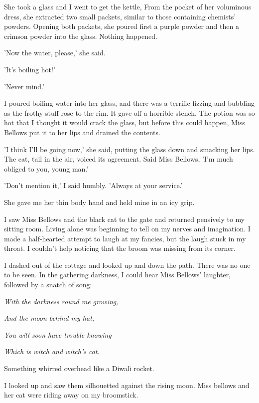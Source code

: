 \par
She took a glass and I went to get the kettle, From the pocket of her voluminous dress, she extracted two small packets, similar to those containing chemists' powders. Opening both packets, she poured first a purple powder and then a crimson powder into the glass. Nothing happened.
\par
'Now the water, please,' she said.
\par
'It's boiling hot!'
\par
'Never mind.'
\par
I poured boiling water into her glass, and there was a terrific fizzing and bubbling as the frothy stuff rose to the rim. It gave off a horrible stench. The potion was so hot that I thought it would crack the glass, but before this could happen, Miss Bellows put it to her lips and drained the contents.
\par
'I think I'll be going now,' she said, putting the glass down and smacking her lips. The cat, tail in the air, voiced its agreement. Said Miss Bellows, 'I'm much obliged to you, young man.'
\par
'Don't mention it,' I said humbly. 'Always at your service.'
\par
She gave me her thin body hand and held mine in an icy grip.
\par
I saw Miss Bellows and the black cat to the gate and returned pensively to my sitting room. Living alone was beginning to tell on my nerves and imagination. I made a half-hearted attempt to laugh at my fancies, but the laugh stuck in my throat. I couldn't help noticing that the broom was missing from its corner.
\par
I dashed out of the cottage and looked up and down the path. There was no one to be seen. In the gathering darkness, I could hear Miss Bellows' laughter, followed by a snatch of song:
\vspace{0.4in}
\par
\textit{With the darkness round me growing,}
\par
\textit{And the moon behind my hat,}
\par
\textit{You will soon have trouble knowing}
\par
\textit{Which is witch and witch's cat.}
\vspace{0.4in}
\par
Something whirred overhead like a Diwali rocket.
\par
I looked up and saw them silhouetted against the rising moon. Miss bellows and her cat were riding away on my broomstick.

